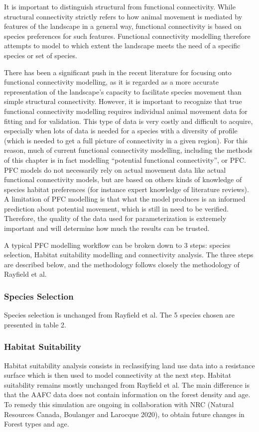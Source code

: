 It is important to distinguish structural from functional connectivity. While structural connectivity strictly refers to how animal movement is mediated by features of the landscape in a general way, functional connectivity is based on species preferences for such features. Functional connectivity modelling therefore attempts to model to which extent the landscape meets the need of a specific species or set of species.

There has been a significant push in the recent literature for focusing onto functional connectivity modelling, as it is regarded as a more accurate representation of  the landscape’s capacity to facilitate species movement than simple structural connectivity. However, it is important to recognize that true functional connectivity modelling requires individual animal movement data for fitting and for validation. This type of data is very costly and difficult to acquire, especially when lots of data is needed for a species with a diversity of profile (which is needed to get a full picture of connectivity in a given region). For this reason, much of current functional connectivity modelling, including the methods of this chapter is in fact modelling “potential functional connectivity”, or PFC. PFC models do not necessarily rely on actual movement data like actual functional connectivity models, but are based on others kinds of knowledge of species habitat preferences (for instance expert knowledge of literature reviews). A limitation of PFC modelling is that what the model produces is an informed prediction about potential movement, which is still in need to be verified. Therefore, the quality of the data used for parameterization is extremely important and will determine how much the results can be trusted.

A typical PFC modelling workflow can be broken down to 3 steps: species selection, Habitat suitability modelling and connectivity analysis. The three steps are described below, and the methodology follows closely the methodology of Rayfield et al.\\

\subsubsection{Species Selection}
Species selection is unchanged from Rayfield et al. The 5 species chosen are presented in table 2.\\

\subsubsection{Habitat Suitability}
Habitat suitability analysis consists in reclassifying land use data into a resistance surface which is then used to model connectivity at the next step.
Habitat suitability remains mostly unchanged from Rayfield et al. The main difference is that the AAFC data does not contain information on the forest density and age. To remedy this simulation are ongoing in collaboration with NRC (Natural Resources Canada, Boulanger and Larocque 2020), to obtain future changes in Forest types and age.\\

